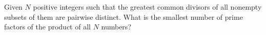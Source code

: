 Given $N$ positive integers such that the greatest common divisors of all nonempty subsets of them are pairwise distinct. What is the smallest number of prime factors of the product of all $N$ numbers?

